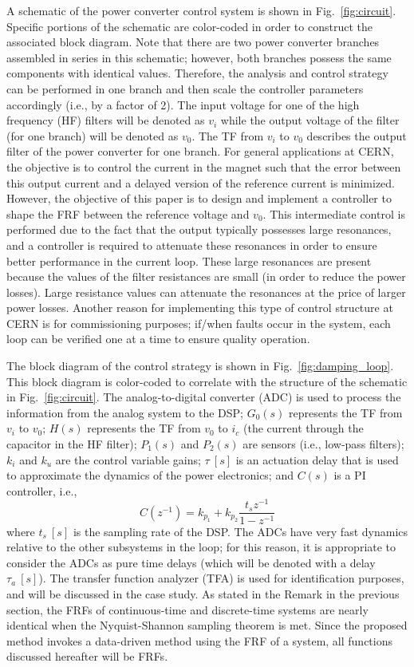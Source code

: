 \documentclass[a4paper, 10pt, conference]{ieeeconf}
\begin{document}
A schematic of the power converter control system is shown in Fig.~\ref{fig:circuit}. Specific portions of the schematic are color-coded in order to construct the associated block diagram. Note that there are two power converter branches assembled in series in this schematic; however, both branches possess the same components with identical values. Therefore, the analysis and control strategy can be performed in one branch and then scale the controller parameters accordingly (i.e., by a factor of 2). The input voltage for one of the high frequency (HF) filters will be denoted as $v_i$ while the output voltage of the filter (for one branch) will be denoted as $v_0$. The TF from $v_i$ to $v_0$ describes the output filter of the power converter for one branch. For general applications at CERN, the objective is to control the current in the magnet such that the error between this output current and a delayed version of the reference current is minimized. However, the objective of this paper is to design and implement a controller to shape the FRF between the reference voltage and $v_0$. This intermediate control is performed due to the fact that the output typically possesses large resonances, and a controller is required to attenuate these resonances in order to ensure better performance in the current loop. These large resonances are present because the values of the filter resistances are small (in order to reduce the power losses). Large resistance values can attenuate the resonances at the price of larger power losses. Another reason for implementing this type of control structure at CERN is for commissioning purposes; if/when faults occur in the system, each loop can be verified one at a time to ensure quality operation.

The block diagram of the control strategy is shown in Fig.~\ref{fig:damping_loop}. This block diagram is color-coded to correlate with the structure of the schematic in Fig.~\ref{fig:circuit}. The analog-to-digital converter (ADC) is used to process the information from the analog system to the DSP; $G_0(s)$ represents the TF from $v_i$ to $v_0$; $H(s)$ represents the TF from $v_0$ to $i_c$ (the current through the capacitor in the HF filter); $P_1(s)$ and $P_2(s)$ are sensors (i.e., low-pass filters); $k_i$ and $k_u$ are the control variable gains; $\tau \: [s]$ is an actuation delay that is used to approximate the dynamics of the power electronics; and $C(s)$ is a PI controller, i.e., $$C(z^{-1}) = k_{p_1} + k_{p_2}\frac{t_s z^{-1}}{1-z^{-1}}$$ where $t_s \: [s]$ is the sampling rate of the DSP. The ADCs have very fast dynamics relative to the other subsystems in the loop; for this reason, it is appropriate to consider the ADCs as pure time delays (which will be denoted with a delay $\tau_{a} \: [s]$). The transfer function analyzer (TFA) is used for identification purposes, and will be discussed in the case study. As stated in the Remark in the previous section, the FRFs of continuous-time and discrete-time systems are nearly identical when the Nyquist-Shannon sampling theorem is met. Since the proposed method invokes a data-driven method using the FRF of a system, all functions discussed hereafter will be FRFs.
\end{document}
